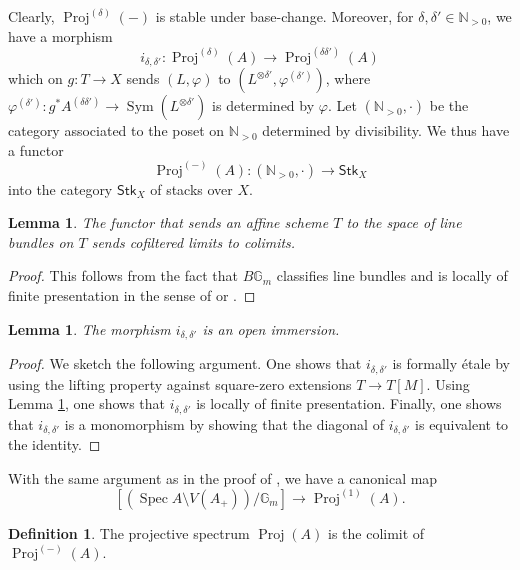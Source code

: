 \documentclass[a4paper,twoside,11pt]{amsart}
\theoremstyle{plain}
\newtheorem{lemma}[theorem]{Lemma}
\theoremstyle{definition}
\newtheorem{definition}[theorem]{Definition}
\theoremstyle{remark}
\numberwithin{equation}{section}
\newcommand{\NN}{\mathbb{N}} %
\newcommand{\GG}{\mathbb{G}} %
\newcommand{\Stk}{\mathsf{Stk}}
\DeclareMathOperator{\Sym}{Sym} %
\DeclareMathOperator{\Spec}{Spec} %
\DeclareMathOperator{\Proj}{Proj} %
\begin{document}
Clearly, $\Proj^{(\delta)}(-)$ is stable under base-change. Moreover, for $\delta,\delta' \in \NN_{>0}$, we have a morphism
\[ i_{\delta,\delta'} \colon \Proj^{(\delta)} (A) \to \Proj^{(\delta\delta')} (A) \]
which on $g \colon T \to X$ sends $(L,\varphi)$ to $(L^{\otimes \delta'},\varphi^{(\delta')})$, where $\varphi^{(\delta')} \colon g^*A^{(\delta\delta')} \to \Sym(L^{\otimes \delta'})$ is determined by $\varphi$. Let $(\NN_{>0},\cdot)$ be the category associated to the poset on $\NN_{>0}$ determined by divisibility. We thus have a functor
\[ \Proj ^{(-)}(A) \colon (\NN_{>0},\cdot) \to \Stk_X  \]
into the category $\Stk_X$ of stacks over $X$.

\begin{lemma}
    \label{Lem:descend_linebs}
    The functor that sends an affine scheme $T$ to the space of line bundles on $T$ sends cofiltered limits to colimits. 
\end{lemma}

\begin{proof}
    This follows from the fact that $B\GG_m$ classifies line bundles and is locally of finite presentation in the sense of \cite[\S1]{Weil} or \cite[Def.~17.4.1.1]{LurieSpectral}.
\end{proof}

\begin{lemma}
\label{Lem:Projd}
    The morphism $i_{\delta,\delta'}$ is an open immersion.
\end{lemma}

\begin{proof}
    We sketch the following argument. One shows that $i_{\delta,\delta'}$ is formally \'{e}tale by using the lifting property against square-zero extensions $T \to T[M]$. Using Lemma \ref{Lem:descend_linebs}, one shows that $i_{\delta,\delta'}$ is locally of finite presentation. Finally, one shows that $i_{\delta,\delta'}$ is a monomorphism by showing that the diagonal of $i_{\delta,\delta'}$ is equivalent to the identity. 
\end{proof}

With the same argument as in the proof of \cite[Prop.~5.5.5]{Hekking}, we have a canonical map
\[  [ (\Spec  A \setminus V(A_+)) / \GG_m ] \to \Proj^{(1)}(A). \]

\begin{definition}
    The projective spectrum $\Proj (A)$ is the colimit of $\Proj ^{(-)}(A)$.
\end{definition}
\end{document}
